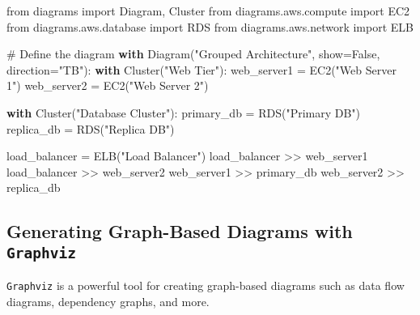 \documentclass[
  letterpaper,
  DIV=11,
  numbers=noendperiod]{scrreprt}
\newenvironment{Shaded}{\begin{snugshade}}{\end{snugshade}}
\newcommand{\CommentTok}[1]{\textcolor[rgb]{0.37,0.37,0.37}{#1}}
\newcommand{\ControlFlowTok}[1]{\textcolor[rgb]{0.00,0.23,0.31}{\textbf{#1}}}
\newcommand{\ImportTok}[1]{\textcolor[rgb]{0.00,0.46,0.62}{#1}}
\newcommand{\NormalTok}[1]{\textcolor[rgb]{0.00,0.23,0.31}{#1}}
\newcommand{\OperatorTok}[1]{\textcolor[rgb]{0.37,0.37,0.37}{#1}}
\newcommand{\StringTok}[1]{\textcolor[rgb]{0.13,0.47,0.30}{#1}}
\newcommand{\VariableTok}[1]{\textcolor[rgb]{0.07,0.07,0.07}{#1}}
\begin{document}
\begin{Shaded}
\begin{Highlighting}[]
\ImportTok{from}\NormalTok{ diagrams }\ImportTok{import}\NormalTok{ Diagram, Cluster}
\ImportTok{from}\NormalTok{ diagrams.aws.compute }\ImportTok{import}\NormalTok{ EC2}
\ImportTok{from}\NormalTok{ diagrams.aws.database }\ImportTok{import}\NormalTok{ RDS}
\ImportTok{from}\NormalTok{ diagrams.aws.network }\ImportTok{import}\NormalTok{ ELB}

\CommentTok{\# Define the diagram}
\ControlFlowTok{with}\NormalTok{ Diagram(}\StringTok{"Grouped Architecture"}\NormalTok{, show}\OperatorTok{=}\VariableTok{False}\NormalTok{, direction}\OperatorTok{=}\StringTok{"TB"}\NormalTok{):}
    \ControlFlowTok{with}\NormalTok{ Cluster(}\StringTok{"Web Tier"}\NormalTok{):}
\NormalTok{        web\_server1 }\OperatorTok{=}\NormalTok{ EC2(}\StringTok{"Web Server 1"}\NormalTok{)}
\NormalTok{        web\_server2 }\OperatorTok{=}\NormalTok{ EC2(}\StringTok{"Web Server 2"}\NormalTok{)}

    \ControlFlowTok{with}\NormalTok{ Cluster(}\StringTok{"Database Cluster"}\NormalTok{):}
\NormalTok{        primary\_db }\OperatorTok{=}\NormalTok{ RDS(}\StringTok{"Primary DB"}\NormalTok{)}
\NormalTok{        replica\_db }\OperatorTok{=}\NormalTok{ RDS(}\StringTok{"Replica DB"}\NormalTok{)}

\NormalTok{    load\_balancer }\OperatorTok{=}\NormalTok{ ELB(}\StringTok{"Load Balancer"}\NormalTok{)}
\NormalTok{    load\_balancer }\OperatorTok{\textgreater{}\textgreater{}}\NormalTok{ web\_server1}
\NormalTok{    load\_balancer }\OperatorTok{\textgreater{}\textgreater{}}\NormalTok{ web\_server2}
\NormalTok{    web\_server1 }\OperatorTok{\textgreater{}\textgreater{}}\NormalTok{ primary\_db}
\NormalTok{    web\_server2 }\OperatorTok{\textgreater{}\textgreater{}}\NormalTok{ replica\_db}
\end{Highlighting}
\end{Shaded}

\subsection{\texorpdfstring{Generating Graph-Based Diagrams with
\texttt{Graphviz}}{Generating Graph-Based Diagrams with Graphviz}}\label{generating-graph-based-diagrams-with-graphviz}

\texttt{Graphviz} is a powerful tool for creating graph-based diagrams
such as data flow diagrams, dependency graphs, and more.
\end{document}
